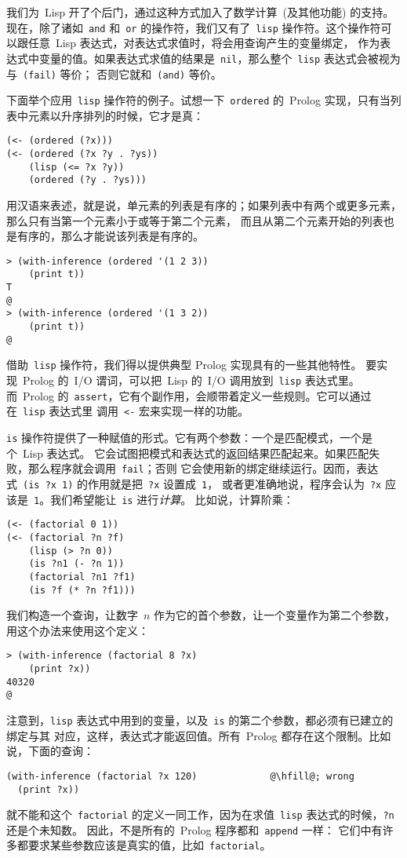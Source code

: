 我们为~Lisp 开了个后门，通过这种方式加入了数学计算~(及其他功能) 的支持。现在，除了诸如~\verb|and| 和~\verb|or| 
的操作符，我们又有了~\verb|lisp| 操作符。这个操作符可以跟任意~Lisp 表达式，对表达式求值时，将会用查询产生的变量绑定，
作为表达式中变量的值。如果表达式求值的结果是~\verb|nil|，那么整个~\verb|lisp| 表达式会被视为与~\verb|(fail)| 等价；
否则它就和~\verb|(and)| 等价。

下面举个应用~\verb|lisp| 操作符的例子。试想一下~\verb|ordered| 的~Prolog 实现，只有当列表中元素以升序排列的时候，它才是真：
\begin{lstlisting}
(<- (ordered (?x)))
(<- (ordered (?x ?y . ?ys))
    (lisp (<= ?x ?y))
    (ordered (?y . ?ys)))
\end{lstlisting}
用汉语来表述，就是说，单元素的列表是有序的；如果列表中有两个或更多元素，那么只有当第一个元素小于或等于第二个元素，
而且从第二个元素开始的列表也是有序的，那么才能说该列表是有序的。
\begin{lstlisting}
> (with-inference (ordered '(1 2 3))
    (print t))
T
@
> (with-inference (ordered '(1 3 2))
    (print t))
@
\end{lstlisting}

借助~\verb|lisp| 操作符，我们得以提供典型 Prolog 实现具有的一些其他特性。
要实现~Prolog 的~\textsc{I/O} 谓词，可以把~Lisp 的~\textsc{I/O} 调用放到~\verb|lisp| 表达式里。
而~Prolog 的~\verb|assert|，它有个副作用，会顺带着定义一些规则。它可以通过在~\verb|lisp| 表达式里
调用~\verb|<-| 宏来实现一样的功能。

\verb|is| 操作符提供了一种赋值的形式。它有两个参数：一个是匹配模式，一个是个~Lisp 表达式。
它会试图把模式和表达式的返回结果匹配起来。如果匹配失败，那么程序就会调用~\verb|fail|；否则
它会使用新的绑定继续运行。因而，表达式~\verb|(is ?x 1)| 的作用就是把~\verb|?x| 设置成~\verb|1|，
或者更准确地说，程序会认为~\verb|?x| 应该是~\verb|1|。我们希望能让~\verb|is| 进行\emph{计算}。
比如说，计算阶乘：
\begin{lstlisting}
(<- (factorial 0 1))
(<- (factorial ?n ?f)
    (lisp (> ?n 0))
    (is ?n1 (- ?n 1))
    (factorial ?n1 ?f1)
    (is ?f (* ?n ?f1)))
\end{lstlisting}

我们构造一个查询，让数字~$n$ 作为它的首个参数，让一个变量作为第二个参数，用这个办法来使用这个定义：
\begin{lstlisting}
> (with-inference (factorial 8 ?x)
    (print ?x))
40320
@
\end{lstlisting}
注意到，\verb|lisp| 表达式中用到的变量，以及~\verb|is| 的第二个参数，都必须有已建立的绑定与其
对应，这样，表达式才能返回值。所有~Prolog 都存在这个限制。比如说，下面的查询：
\begin{lstlisting}[escapechar=\@]
(with-inference (factorial ?x 120)             @\hfill@; wrong
  (print ?x))
\end{lstlisting}
就不能和这个~\verb|factorial| 的定义一同工作，因为在求值~\verb|lisp| 表达式的时候，\verb|?n| 还是个未知数。
因此，不是所有的~Prolog 程序都和~\verb|append| 一样：
它们中有许多都要求某些参数应该是真实的值，比如~\verb|factorial|。


